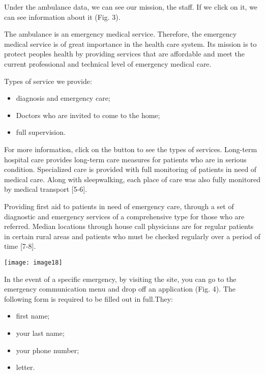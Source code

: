 \begin{multicols}{2}

Under the ambulance data, we can see our mission, the staff. If we click
on it, we can see information about it (Fig. 3).

The ambulance is an emergency medical service. Therefore, the emergency
medical service is of great importance in the health care system. Its
mission is to protect people\textquotesingle s health by providing
services that are affordable and meet the current professional and
technical level of emergency medical care.

Types of service we provide:

\begin{itemize}
\item
  diagnosis and emergency care;
\item
  Doctors who are invited to come to the home;
\item
  full supervision.
\end{itemize}

For more information, click on the button to see the types of services.
Long-term hospital care provides long-term care measures for patients
who are in serious condition. Specialized care is provided with full
monitoring of patients in need of medical care. Along with sleepwalking,
each place of care was also fully monitored by medical transport
{[}5-6{]}.

Providing first aid to patients in need of emergency care, through a set
of diagnostic and emergency services of a comprehensive type for those
who are referred. Median locations through house call physicians are for
regular patients in certain rural areas and patients who must be checked
regularly over a period of time {[}7-8{]}.

{\centering
\texttt{[image: image18]}
}

In the event of a specific emergency, by visiting the site, you can go
to the emergency communication menu and drop off an application (Fig.
4). The following form is required to be filled out in full.They:

\begin{itemize}
\item
  first name;
\item
  your last name;
\item
  your phone number;
\item
  letter.
\end{itemize}

\end{multicols}

